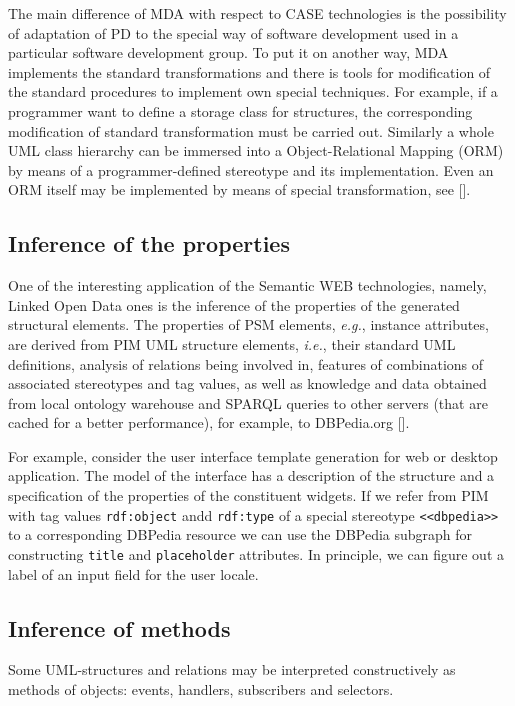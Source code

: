 \documentclass[conference,a4paper]{IEEEtran}
\begin{document}
The main difference of MDA with respect to CASE technologies is the possibility of adaptation of PD to the special way of software development used in a particular software development group.  To put it on another way, MDA implements the standard transformations and there is tools for modification of the standard procedures to implement own special techniques.  For example, if a programmer want to define a storage class for structures, the corresponding modification of standard transformation must be carried out.  Similarly a whole UML class hierarchy can be immersed into a Object-Relational Mapping (ORM) by means of a programmer-defined stereotype and its implementation.  Even an ORM itself may be implemented by means of special transformation, see [].


\subsection{Inference of the properties}
\label{sec:infprop}

One of the interesting application of the Semantic WEB technologies, namely, Linked Open Data ones is the inference of the properties of the generated structural elements.  The properties of PSM elements, \emph{e.g.}, instance attributes, are derived from PIM UML structure elements, \emph{i.e.}, their standard UML definitions, analysis of relations being involved in, features of combinations of associated stereotypes and tag values, as well as knowledge and data obtained from local ontology warehouse and SPARQL queries to other servers (that are cached for a better performance), for example, to DBPedia.org [].

For example, consider the user interface template generation for web or desktop application.  The model of the interface has a description of the structure and a specification of the properties of the constituent widgets.  If we refer from PIM with tag values \texttt{rdf:object} andd \texttt{rdf:type} of a special stereotype \texttt{<<dbpedia>>} to a corresponding DBPedia resource we can use the DBPedia subgraph for constructing \texttt{title} and \texttt{placeholder} attributes.  In principle, we can figure out a label of an input field for the user locale.

\subsection{Inference of methods}
\label{sec:infmeth}

Some UML-structures and relations may be interpreted constructively as methods of objects: events, handlers, subscribers and selectors.
\end{document}
